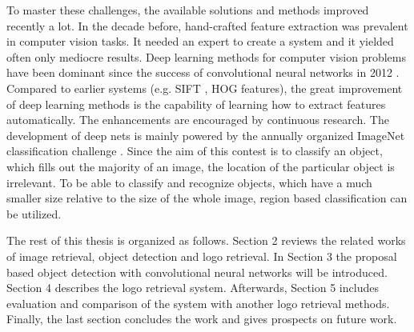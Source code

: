 To master these challenges, the available solutions and methods improved recently a lot. In the decade before, hand-crafted feature extraction was prevalent in computer vision tasks. It needed an expert to create a system and it yielded often only mediocre results. Deep learning methods for computer vision problems have been dominant since the success of convolutional neural networks in 2012 \cite{NIPS2012_4824}. Compared to earlier systems (e.g. SIFT \cite{Lowe:2004:DIF:993451.996342}, HOG \cite{Dalal:2005:HOG:1068507.1069007} features), the great improvement of deep learning methods is the capability of learning how to extract features automatically. The enhancements are encouraged by continuous research. The development of deep nets is mainly powered by the annually organized ImageNet classification challenge \cite{ILSVRC15}. Since the aim of this contest is to classify an object, which fills out the majority of an image, the location of the particular object is irrelevant. To be able to classify and recognize objects, which have a much smaller size relative to the size of the whole image, region based classification can be utilized.

The rest of this thesis is organized as follows. Section 2 reviews the related works of image retrieval, object detection and logo retrieval. In Section 3 the proposal based object detection with convolutional neural networks will be introduced. Section 4 describes the logo retrieval system. Afterwards, Section 5 includes evaluation and comparison of the system with another logo retrieval methods. Finally, the last section concludes the work and gives prospects on future work.